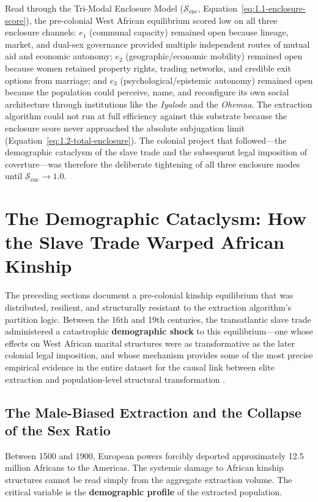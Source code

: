 Read through the Tri-Modal Enclosure Model (\(\mathcal{S}_{\text{enc}}\), Equation~\ref{eq:1.1-enclosure-score}), the pre-colonial West African equilibrium scored low on all three enclosure channels: \(e_1\) (communal capacity) remained open because lineage, market, and dual-sex governance provided multiple independent routes of mutual aid and economic autonomy; \(e_2\) (geographic/economic mobility) remained open because women retained property rights, trading networks, and credible exit options from marriage; and \(e_3\) (psychological/epistemic autonomy) remained open because the population could perceive, name, and reconfigure its own social architecture through institutions like the \textit{Iyalode} and the \textit{Ohemaa}. The extraction algorithm could not run at full efficiency against this substrate because the enclosure score never approached the absolute subjugation limit (Equation~\ref{eq:1.2-total-enclosure}). The colonial project that followed---the demographic cataclysm of the slave trade and the subsequent legal imposition of coverture---was therefore the deliberate tightening of all three enclosure modes until \(\mathcal{S}_{\text{enc}} \to 1.0\).

\section{The Demographic Cataclysm: How the Slave Trade Warped African Kinship}
\label{sec:demographic}

The preceding sections document a pre-colonial kinship equilibrium that was distributed, resilient, and structurally resistant to the extraction algorithm's partition logic. Between the 16th and 19th centuries, the transatlantic slave trade administered a catastrophic \textbf{demographic shock} to this equilibrium---one whose effects on West African marital structures were as transformative as the later colonial legal imposition, and whose mechanism provides some of the most precise empirical evidence in the entire dataset for the causal link between elite extraction and population-level structural transformation \cite{fenske_polygyny, slave_trade_polygyny_unl, slave_trade_polygyny_mpra}.

\subsection{The Male-Biased Extraction and the Collapse of the Sex Ratio}
\label{sec:sex_ratio}

Between 1500 and 1900, European powers forcibly deported approximately 12.5 million Africans to the Americas. The systemic damage to African kinship structures cannot be read simply from the aggregate extraction volume. The critical variable is the \textbf{demographic profile} of the extracted population.

